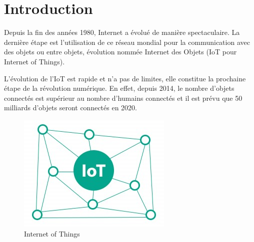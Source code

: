 \section*{Introduction}
Depuis la fin des années 1980, Internet a évolué de manière spectaculaire. La dernière étape est l’utilisation de ce réseau mondial pour la communication avec des objets ou entre objets, évolution nommée Internet des Objets (IoT pour Internet of Things).

L’évolution de l’IoT est rapide et n’a pas de limites, elle constitue la prochaine étape de la révolution numérique. En effet, depuis 2014, le nombre d’objets connectés est supérieur au nombre d’humains connectés et il est prévu que 50 milliards d’objets seront connectés en 2020.

\begin{figure}[h]
	\centering
    \includegraphics[scale=0.8]{img/part1/2.1}
    \caption{Internet of Things}
\end{figure}
